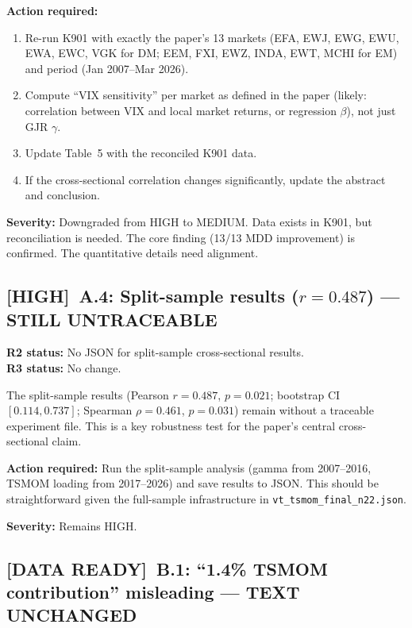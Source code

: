 \documentclass[12pt,a4paper]{article}
\newcommand{\HIGH}{\textcolor{highsev}{\textbf{[HIGH]}}}
\newcommand{\DATAREADY}{\textcolor{fixedblue}{\textbf{[DATA READY]}}}
\begin{document}
\noindent\textbf{Action required:}
\begin{enumerate}[nosep]
\item Re-run K901 with exactly the paper's 13 markets (EFA, EWJ, EWG, EWU, EWA, EWC, VGK for DM; EEM, FXI, EWZ, INDA, EWT, MCHI for EM) and period (Jan 2007--Mar 2026).
\item Compute ``VIX sensitivity'' per market as defined in the paper (likely: correlation between VIX and local market returns, or regression $\beta$), not just GJR $\gamma$.
\item Update Table~5 with the reconciled K901 data.
\item If the cross-sectional correlation changes significantly, update the abstract and conclusion.
\end{enumerate}

\textbf{Severity:} \textcolor{okgreen}{Downgraded from HIGH to MEDIUM.} Data exists in K901, but reconciliation is needed. The core finding (13/13 MDD improvement) is confirmed. The quantitative details need alignment.

\bigskip


\subsection{\HIGH\ A.4: Split-sample results ($r = 0.487$) --- STILL UNTRACEABLE}

\textbf{R2 status:} No JSON for split-sample cross-sectional results.\\
\textbf{R3 status:} \textcolor{highsev}{No change.}

The split-sample results (Pearson $r = 0.487$, $p = 0.021$; bootstrap CI $[0.114, 0.737]$; Spearman $\rho = 0.461$, $p = 0.031$) remain without a traceable experiment file. This is a key robustness test for the paper's central cross-sectional claim.

\textbf{Action required:} Run the split-sample analysis (gamma from 2007--2016, TSMOM loading from 2017--2026) and save results to JSON. This should be straightforward given the full-sample infrastructure in \texttt{vt\_tsmom\_final\_n22.json}.

\textbf{Severity:} \textcolor{highsev}{Remains HIGH.}

\bigskip


\subsection{\DATAREADY\ B.1: ``1.4\% TSMOM contribution'' misleading --- TEXT UNCHANGED}
\end{document}
